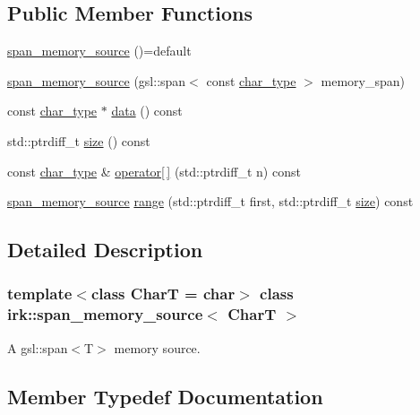 \subsection*{Public Member Functions}
\begin{DoxyCompactItemize}
\item 
\mbox{\hyperlink{classirk_1_1span__memory__source_a39cae60a3e106cb9cb977b46e540c8b3}{span\+\_\+memory\+\_\+source}} ()=default
\item 
\mbox{\hyperlink{classirk_1_1span__memory__source_a4de152530448b9a46951d99320333ca9}{span\+\_\+memory\+\_\+source}} (gsl\+::span$<$ const \mbox{\hyperlink{classirk_1_1span__memory__source_a769d88b11f7c2882a006e93edb2cdb79}{char\+\_\+type}} $>$ memory\+\_\+span)
\item 
const \mbox{\hyperlink{classirk_1_1span__memory__source_a769d88b11f7c2882a006e93edb2cdb79}{char\+\_\+type}} $\ast$ \mbox{\hyperlink{classirk_1_1span__memory__source_a117f7439cc35e16c02b3656104020ad3}{data}} () const
\item 
std\+::ptrdiff\+\_\+t \mbox{\hyperlink{classirk_1_1span__memory__source_a6ab9aa714bdb0289f05cf68c153d1161}{size}} () const
\item 
const \mbox{\hyperlink{classirk_1_1span__memory__source_a769d88b11f7c2882a006e93edb2cdb79}{char\+\_\+type}} \& \mbox{\hyperlink{classirk_1_1span__memory__source_ab3e7c421404d5790d79b74e142cedb52}{operator\mbox{[}$\,$\mbox{]}}} (std\+::ptrdiff\+\_\+t n) const
\item 
\mbox{\hyperlink{classirk_1_1span__memory__source}{span\+\_\+memory\+\_\+source}} \mbox{\hyperlink{classirk_1_1span__memory__source_aec190b78f31c5d7a005eb4b89d28939c}{range}} (std\+::ptrdiff\+\_\+t first, std\+::ptrdiff\+\_\+t \mbox{\hyperlink{classirk_1_1span__memory__source_a6ab9aa714bdb0289f05cf68c153d1161}{size}}) const
\end{DoxyCompactItemize}


\subsection{Detailed Description}
\subsubsection*{template$<$class CharT = char$>$\newline
class irk\+::span\+\_\+memory\+\_\+source$<$ Char\+T $>$}

A gsl\+::span$<$\+T$>$ memory source. 

\subsection{Member Typedef Documentation}
\mbox{\label{classirk_1_1span__memory__source_a769d88b11f7c2882a006e93edb2cdb79}} 
